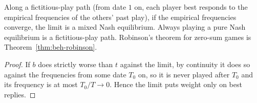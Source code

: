 \begin{theorem}
\label{thm:beh-fictitious}
\leanok
Along a fictitious-play path (from date $1$ on, each player best responds to the empirical frequencies of the others'
past play), if the empirical frequencies converge, the limit is a mixed Nash equilibrium. Always playing a pure Nash
equilibrium is a fictitious-play path. Robinson's theorem for zero-sum games is Theorem~\ref{thm:beh-robinson}.
\end{theorem}
\begin{proof}
\leanok
If $b$ does strictly worse than $t$ against the limit, by continuity it does so against the frequencies from some
date $T_0$ on, so it is never played after $T_0$ and its frequency is at most $T_0/T\to0$. Hence the limit puts weight
only on best replies.
\end{proof}

